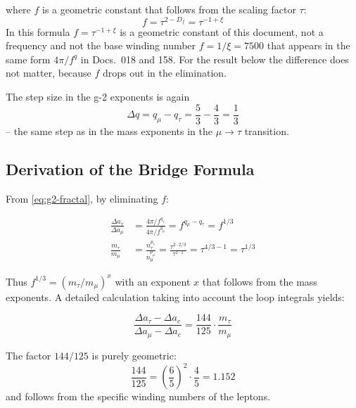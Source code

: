 	where $f$ is a geometric constant that follows from the scaling factor $\tau$:
	\begin{equation}
		f = \tau^{2-D_f} = \tau^{-1+\xi}
	\end{equation}
	In this formula $f = \tau^{-1+\xi}$ is a geometric constant of this document, not a frequency and not the base winding number $f = 1/\xi = 7500$ that appears in the same form $4\pi/f^{q}$ in Docs.~018 and 158. For the result below the difference does not matter, because $f$ drops out in the elimination.

	The step size in the g-2 exponents is again
	\begin{equation}
		\Delta q = q_\mu - q_\tau = \frac{5}{3} - \frac{4}{3} = \frac{1}{3}
	\end{equation}
	-- the same step as in the mass exponents in the $\mu \to \tau$ transition.
	
	\subsection{Derivation of the Bridge Formula}
	
	From \eqref{eq:g2-fractal}, by eliminating $f$:
	
	\begin{align}
		\frac{\Delta a_\tau}{\Delta a_\mu} &= \frac{4\pi/f^{q_\tau}}{4\pi/f^{q_\mu}} = f^{q_\mu - q_\tau} = f^{1/3} \\
		\frac{m_\tau}{m_\mu} &= \frac{n_\tau^{p_\tau}}{n_\mu^{p_\mu}} = \frac{\tau^{2 \cdot 2/3}}{\tau^{1 \cdot 1}} = \tau^{4/3 - 1} = \tau^{1/3}
	\end{align}
	
	Thus $f^{1/3} = (m_\tau/m_\mu)^x$ with an exponent $x$ that follows from the mass exponents. A detailed calculation taking into account the loop integrals yields:
	
	\begin{keypoint}
		\begin{equation}
			\frac{\Delta a_\tau - \Delta a_e}{\Delta a_\mu - \Delta a_e} = \frac{144}{125} \cdot \frac{m_\tau}{m_\mu}
			\label{eq:bridge-formula}
		\end{equation}
	\end{keypoint}
	
	The factor $144/125$ is purely geometric:
	\begin{equation}
		\frac{144}{125} = \left( \frac{6}{5} \right)^2 \cdot \frac{4}{5} = 1.152
	\end{equation}
	and follows from the specific winding numbers of the leptons.
	
